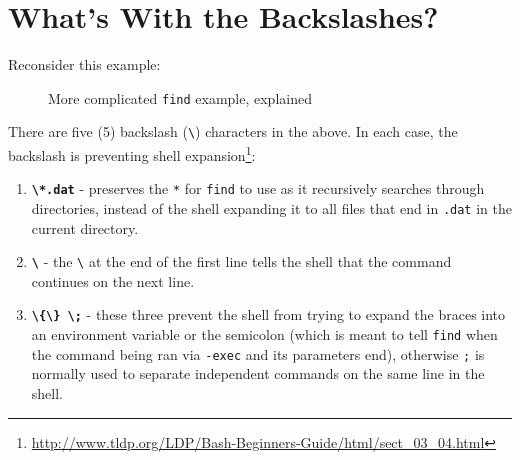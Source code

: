 \documentclass[10pt,american,]{book}
\newenvironment{Shaded}{\begin{snugshade}}{\end{snugshade}}
\newcommand{\KeywordTok}[1]{\textcolor[rgb]{0.13,0.29,0.53}{\textbf{{#1}}}}
\newcommand{\DataTypeTok}[1]{\textcolor[rgb]{0.13,0.29,0.53}{{#1}}}
\newcommand{\NormalTok}[1]{{#1}}
\renewcommand{\href}[2]{#2\footnote{\url{#1}}}
\numberwithin{figure}{chapter}
\DeclareRobustCommand{\drcap}[1]{\begin{figure}[H]\caption{#1}\end{figure}}
\renewcommand{\KeywordTok}[1]{{#1}}
\renewcommand{\DataTypeTok}[1]{{#1}}
\renewcommand{\NormalTok}[1]{{#1}}
\begin{document}
\section*{What's With the
Backslashes?}\label{whats-with-the-backslashes}

Reconsider this example:

\drcap{More complicated \texttt{find} example, explained}

\begin{Shaded}
\end{Shaded}

There are five (5) backslash (\texttt{\textbackslash{}}) characters in
the above. In each case, the backslash is preventing
\href{http://www.tldp.org/LDP/Bash-Beginners-Guide/html/sect_03_04.html}{shell
expansion}: 

\begin{enumerate}
\def\labelenumi{\arabic{enumi}.}
\item
  \textbf{\texttt{\textbackslash{}*.dat}} - preserves the \texttt{*} for
  \texttt{find} to use as it recursively searches through directories,
  instead of the shell expanding it to all files that end in
  \texttt{.dat} in the current directory.
\item
  \textbf{\texttt{\textbackslash{}}} - the \texttt{\textbackslash{}} at
  the end of the first line tells the shell that the command continues
  on the next line.
\item
  \textbf{\texttt{\textbackslash{}\{\textbackslash{}\}\ \textbackslash{};}}
  - these three prevent the shell from trying to expand the braces into
  an environment variable or the semicolon (which is meant to tell
  \texttt{find} when the command being ran via \texttt{-exec} and its
  parameters end), otherwise \texttt{;} is normally used to separate
  independent commands on the same line in the shell.
\end{enumerate}
\end{document}
